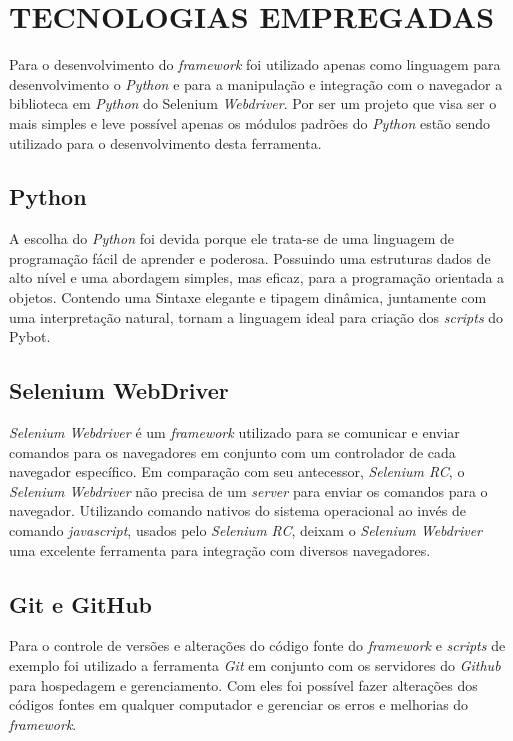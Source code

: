 %
%

\chapter{TECNOLOGIAS EMPREGADAS}\label{chap:tec}
        Para o desenvolvimento do \textit{framework} foi utilizado apenas como linguagem para desenvolvimento o \emph{Python}
        e para a manipulação e integração com o navegador a biblioteca em \emph{Python} do Selenium \emph{Webdriver}. Por ser um
        projeto que visa ser o mais simples e leve possível apenas os módulos padrões do \emph{Python} estão sendo utilizado
        para o desenvolvimento desta ferramenta.


        \section{Python}

            A escolha do \emph{Python} \cite{Python} foi devida porque ele trata-se de uma linguagem de programação fácil de aprender e poderosa.
            Possuindo uma estruturas dados de alto nível e uma abordagem simples, mas eficaz, para a programação orientada
            a objetos. Contendo uma Sintaxe elegante e tipagem dinâmica, juntamente com uma interpretação natural, tornam
            a linguagem ideal para criação dos \emph{scripts} do Pybot.

        \section{Selenium WebDriver}
        \label{webdriver}
            \emph{Selenium Webdriver} \cite{webdriver} é um \emph{framework} utilizado para se comunicar e enviar comandos para os navegadores
            em conjunto com um controlador de cada navegador específico. Em comparação com seu antecessor, \emph{Selenium RC}, o \emph{Selenium Webdriver}
            não precisa de um \emph{server} para enviar os comandos para o navegador. Utilizando comando nativos do sistema operacional ao invés de
            comando \emph{javascript}, usados pelo \emph{Selenium RC}, deixam o \emph{Selenium Webdriver} uma excelente ferramenta para integração com diversos navegadores.

        \section{Git e GitHub}
            Para o controle de versões e alterações do código fonte do \emph{framework} e \emph{scripts} de exemplo foi utilizado a ferramenta
            \emph{Git} \cite{git} em conjunto com os servidores do \emph{Github} \cite{github} para hospedagem e gerenciamento. Com eles foi possível
            fazer alterações dos códigos fontes em qualquer computador e gerenciar os erros e melhorias do \emph{framework}.
